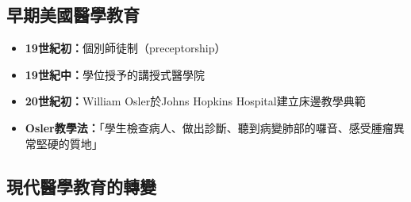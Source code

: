 \documentclass[11pt,a4paper]{article}
\begin{document}
\subsection{早期美國醫學教育}

\begin{itemize}
    \item \textbf{19世紀初：}個別師徒制（preceptorship）
    \item \textbf{19世紀中：}學位授予的講授式醫學院
    \item \textbf{20世紀初：}William Osler於Johns Hopkins Hospital建立床邊教學典範
    \item \textbf{Osler教學法：}「學生檢查病人、做出診斷、聽到病變肺部的囉音、感受腫瘤異常堅硬的質地」
\end{itemize}

\subsection{現代醫學教育的轉變}
\end{document}
